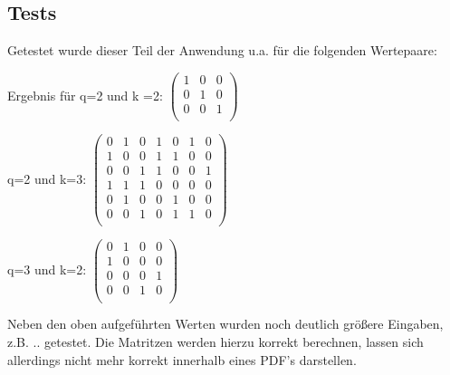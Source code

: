 \subsection{Tests}
Getestet wurde dieser Teil der Anwendung u.a. für die folgenden Wertepaare:

\begin{description}
	\item
	Ergebnis für q=2 und k =2:
	$
		\begin{pmatrix}
			1 & 0 & 0 \\
			0 & 1 & 0 \\
			0 & 0 & 1 \\
		\end{pmatrix}
	$
	\item
	q=2 und k=3:			
	$
	\begin{pmatrix}
		0 & 1 & 0 & 1 & 0 & 1 & 0 \\
		1 & 0 & 0 & 1 & 1 & 0 & 0 \\
		0 & 0 & 1 & 1 & 0 & 0 & 1 \\
		1 & 1 & 1 & 0 & 0 & 0 & 0 \\
		0 & 1 & 0 & 0 & 1 & 0 & 0 \\
		0 & 0 & 1 & 0 & 1 & 1 & 0 \\
	\end{pmatrix}
	$ 
	\item 
	q=3 und k=2: 
	$
	\begin{pmatrix}
		0 & 1 & 0 & 0 \\
		1 & 0 & 0 & 0 \\
		0 & 0 & 0 & 1 \\
		0 & 0 & 1 & 0 \\		
	\end{pmatrix}
	$
\end{description}
Neben den oben aufgeführten Werten wurden noch deutlich größere Eingaben, z.B. .. getestet. Die Matritzen werden hierzu korrekt berechnen, lassen sich allerdings nicht mehr korrekt innerhalb eines PDF's darstellen.